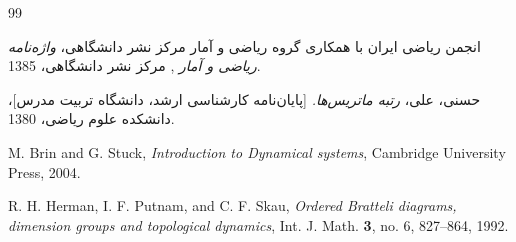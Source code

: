 %
%
%
%
\small

\begin{thebibliography}{99}

انجمن ریاضی ایران با همکاری گروه ریاضی و آمار مرکز نشر دانشگاهی، 
\emph{%
واژه‌نامه ریاضی و آمار%
},
مرکز نشر دانشگاهی، 1385.

حسنی، علی، 
\emph{%
رتبه ماتریس‌ها.%
}
[پایان‌نامه کارشناسی ارشد، دانشگاه تربیت مدرس]، دانشکده علوم ریاضی، 1380.

\begin{LTRitems}
\resetlatinfont

M. Brin and G. Stuck, \emph{Introduction to Dynamical systems}, 
Cambridge University Press, 2004.

R. H. Herman, I. F. Putnam, and C. F. Skau, \emph{Ordered Bratteli diagrams, 
dimension groups and topological dynamics}, Int. J. Math. \textbf{3}, no. 6, 
827--864, 1992.

\end{LTRitems}

\end{thebibliography}
